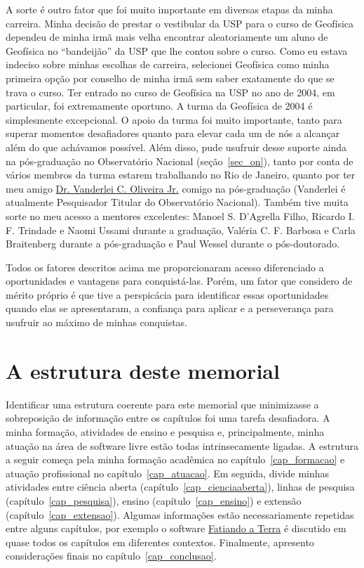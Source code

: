 \documentclass[10pt,a4paper,oneside]{book}
\begin{document}
A sorte é outro fator que foi muito importante em diversas etapas da minha
carreira.
Minha decisão de prestar o vestibular da USP para o curso de Geofísica dependeu
de minha irmã mais velha encontrar aleatoriamente um aluno de Geofísica no
``bandeijão'' da USP que lhe contou sobre o curso.
Como eu estava indeciso sobre minhas escolhas de carreira, selecionei Geofísica
como minha primeira opção por conselho de minha irmã sem saber exatamente do
que se trava o curso.
Ter entrado no curso de Geofísica na USP no ano de 2004, em particular, foi
extremamente oportuno.
A turma da Geofísica de 2004 é simplesmente excepcional.
O apoio da turma foi muito importante, tanto para superar momentos desafiadores
quanto para elevar cada um de nós a alcançar além do que achávamos possível.
Além disso, pude usufruir desse suporte ainda na pós-graduação no Observatório
Nacional (seção~\ref{sec_on}), tanto por conta de vários membros da turma
estarem trabalhando no Rio de Janeiro, quanto por ter meu amigo
\href{https://www.pinga-lab.org/people/oliveira-jr.html}{Dr. Vanderlei C. Oliveira Jr.}
comigo na pós-graduação (Vanderlei é atualmente Pesquisador Titular do
Observatório Nacional).
Também tive muita sorte no meu acesso a mentores excelentes:
Manoel S. D'Agrella Filho, Ricardo I. F. Trindade e Naomi Ussami
durante a graduação, Valéria C. F. Barbosa e Carla Braitenberg durante a
pós-graduação e Paul Wessel durante o pós-doutorado.

Todos os fatores descritos acima me proporcionaram acesso diferenciado a
oportunidades e vantagens para conquistá-las.
Porém, um fator que considero de mérito próprio é que tive a perspicácia para
identificar essas oportunidades quando elas se apresentaram, a confiança para
aplicar e a perseverança para usufruir ao máximo de minhas conquistas.

\section{A estrutura deste memorial}

Identificar uma estrutura coerente  para este memorial que minimizasse a
sobreposição de informação entre os capítulos foi uma tarefa desafiadora.
A minha formação, atividades de ensino e pesquisa e, principalmente, minha
atuação na área de software livre estão todas intrinsecamente ligadas.
A estrutura a seguir começa pela minha formação acadêmica no
capítulo~\ref{cap_formacao} e atuação profissional no
capítulo~\ref{cap_atuacao}.
Em seguida, divide minhas atividades
entre ciência aberta (capítulo~\ref{cap_cienciaaberta}),
linhas de pesquisa (capítulo~\ref{cap_pesquisa}),
ensino (capítulo~\ref{cap_ensino}) e extensão (capítulo~\ref{cap_extensao}).
Algumas informações estão necessariamente repetidas entre alguns capítulos,
por exemplo o software \href{https://www.fatiando.org}{Fatiando a Terra}
é discutido em quase todos os capítulos em diferentes contextos.
Finalmente, apresento considerações finais no capítulo~\ref{cap_conclusao}.
\end{document}
